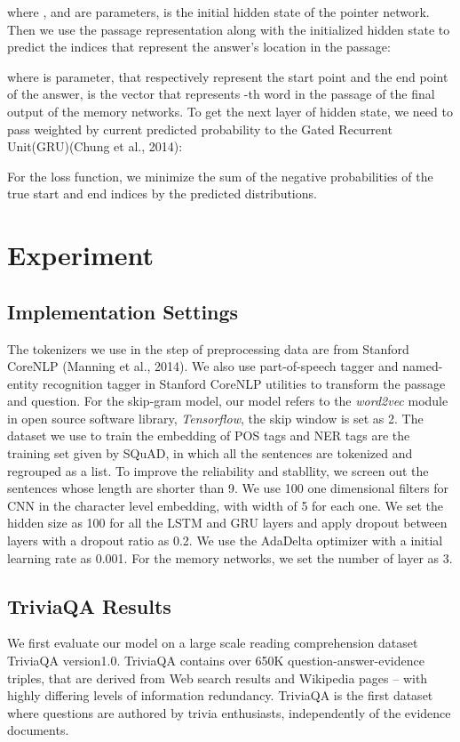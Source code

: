 \documentclass[letterpaper]{article}
\begin{document}
where , and  are parameters,  is the initial hidden state of the pointer network. Then we use the passage representation along with the initialized hidden state to predict the indices that represent the answer's location in the passage:



where  is parameter,  that respectively represent the start point and the end point of the answer,  is the vector that represents -th word in the passage of the final output of the memory networks. To get the next layer of hidden state, we need to pass  weighted by current predicted probability  to the Gated Recurrent Unit(GRU)(Chung et al., 2014):


For the loss function, we minimize the sum of the negative probabilities of the true start and end indices by the predicted distributions.






\section{Experiment}
\subsection{Implementation Settings}
The tokenizers we use in the step of preprocessing data are from Stanford CoreNLP (Manning et al., 2014). We also use part-of-speech tagger and named-entity recognition tagger in Stanford CoreNLP utilities to transform the passage and question. For the skip-gram model, our model refers to the \emph{word2vec} module in open source software library, \emph{Tensorflow}, the skip window is set as 2. The dataset we use to train the embedding of POS tags and NER tags are the training set given by SQuAD, in which all the sentences are tokenized and regrouped as a list. To improve the reliability and stabllity, we screen out the sentences whose length are shorter than 9. We use 100 one dimensional filters for CNN in the character level embedding, with width of 5 for each one. We set the hidden size as 100 for all the LSTM and GRU layers and apply dropout\citep{srivastava2014dropout} between layers with a dropout ratio as 0.2. We use the AdaDelta \citep{zeiler2012adadelta} optimizer with a initial learning rate as 0.001. For the memory networks, we set the number of layer as 3. 


 \subsection{TriviaQA Results}
We first evaluate our model on a large scale reading comprehension dataset TriviaQA version1.0\citep{joshi2017triviaqa}. TriviaQA contains over 650K question-answer-evidence triples, that are derived from Web search results and Wikipedia pages – with highly differing levels of information redundancy. TriviaQA is the first dataset where questions are authored by trivia enthusiasts, independently of the evidence documents. 
\end{document}

